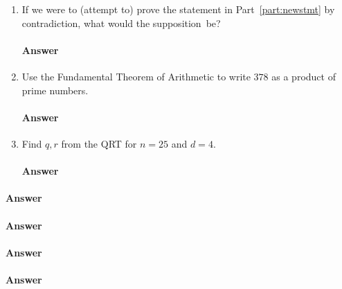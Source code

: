 \begin{enumerate}
    \item If we were to (attempt to) prove the statement in
        Part~\ref{part:newstmt} by contradiction, what would the supposition~be?
        \paragraph{Answer}
        \todo{}

    \item Use the Fundamental Theorem of Arithmetic to write $378$ as a product
        of prime numbers.
        \paragraph{Answer}
        \todo{}

    \item Find $q,r$ from the QRT for $n=25$ and $d=4$.
        \paragraph{Answer}
        \todo{}

\end{enumerate}

\collab{\todo{}}


\paragraph{Answer}
\todo{}

\collab{\todo{}}


\paragraph{Answer}
\todo{}

\collab{\todo{}}


\paragraph{Answer}
\todo{}

\collab{\todo{}}


\paragraph{Answer}
\todo{}
